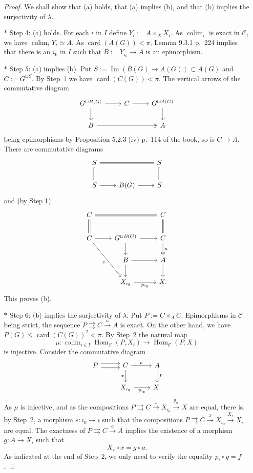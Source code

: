 \documentclass[12pt]{article}%
\theoremstyle{remark}
\theoremstyle{definition}
\newcommand{\nn}{\noindent}
\newcommand{\C}{\mathcal C}
\newcommand{\parar}{\rightrightarrows}
\newcommand{\xr}{\xrightarrow}
\DeclareMathOperator*{\colim}{colim}
\DeclareMathOperator{\card}{card}%
\DeclareMathOperator{\Ima}{Im}
\DeclareMathOperator{\Hom}{Hom}%
\begin{document}
\begin{proof}
We shall show that (a) holds, that (a) implies (b), and that (b) implies the surjectivity of $\lambda$.

\nn $*$ Step 4: (a) holds. For each $i$ in $I$ define $Y_i:=A\times_XX_i$. As $\colim_i$ is exact in $\C$, we have $\colim_iY_i\simeq A$. As $\card(A(G))<\pi$, Lemma 9.3.1 p.~224 implies that there is an $i_0$ in $I$ such that $B:=Y_{i_0}\to A$ is an epimorphism.

\nn $*$ Step 5: (a) implies (b). Put $S:=\Ima(B(G)\to A(G))\subset A(G)$ and $C:=G^{\sqcup S}$. By Step~1 we have $\card(C(G))<\pi$. The vertical arrows of the commutative diagram 
$$
\begin{tikzcd}
G^{\sqcup B(G)}\ar{r}\ar{d}&C\ar{r}&G^{\sqcup A(G)}\ar{d}\\ 
B\ar[two heads]{rr}&&A
\end{tikzcd}
$$ 
being epimorphisms by Proposition 5.2.3 (iv) p.~114 of the book, so is $C\to A$. There are commutative diagrams 
$$
\begin{tikzcd}
S\ar[equal]{rr}\ar[equal]{d}&&S\ar[equal]{d}\\ 
S\ar{r}&B(G)\ar{r}&S
\end{tikzcd}
$$ 
and (by Step 1)
$$
\begin{tikzcd}
C\ar[equal]{rr}\ar[equal]{d}&&C\ar[equal]{d}\\ 
C\ar{r}\ar{rdd}[swap]{x}&G^{\sqcup B(G)}\ar{r}\ar{d}&C\ar[two heads]{d}{a}\\ 
{}&B\ar{r}\ar{d}&A\ar{d}\\ 
{}&X_{i_0}\ar{r}[swap]{p_{i_0}}&X.
\end{tikzcd}
$$ 
This proves (b).

\nn $*$ Step 6: (b) implies the surjectivity of $\lambda$. Put $P:=C\times_AC$. Epimorphisms in $\C$ being strict, the sequence $P\parar C\xr aA$ is exact. On the other hand, we have $P(G)\le\card(C(G))^2<\pi$. By Step~2 the natural map 
$$
\mu:\colim_{i\in I}\Hom_\C(P,X_i)\to\Hom_\C(P,X)
$$ 
is injective. Consider the commutative diagram 
$$
\begin{tikzcd}
P\ar[yshift=0.7ex]{r}\ar[yshift=-0.7ex]{r}&C\ar{r}{a}\ar{d}[swap]{x}&A\ar{d}{f}\\ 
{}&X_{i_0}\ar{r}[swap]{p_{i_0}}&X.
\end{tikzcd}
$$ 
As $\mu$ is injective, and as the compositions $P\parar C\xr xX_{i_0}\xr{p_{i_0}}X$ are equal, there is, by Step~2, a morphism $s:i_0\to i$ such that the compositions $P\parar C\xr xX_{i_0}\xr{X_s} X_i$ are equal. The exactness of $P\parar C\xr aA$ implies the existence of a morphism $g:A\to X_i$ such that 
%
\begin{equation}\label{ga}
X_s\circ x=g\circ a.
\end{equation}
%
As indicated at the end of Step~2, we only need to verify the equality $p_i\circ g=f$.


\end{proof}
\end{document}
